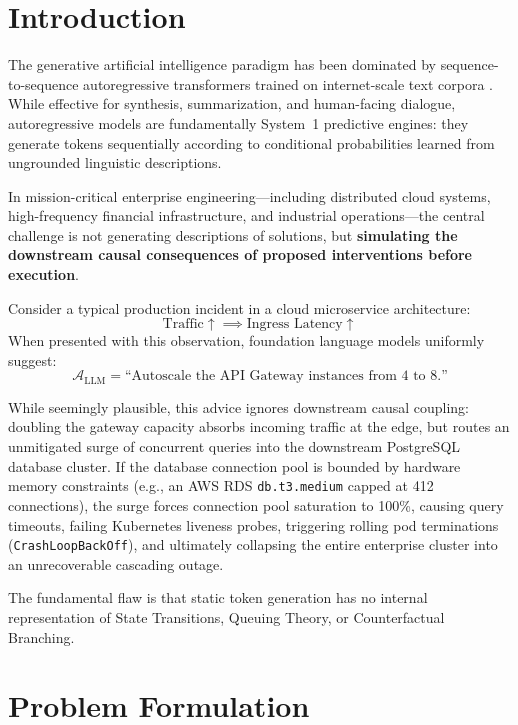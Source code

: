 \documentclass[10pt,twocolumn,letterpaper]{article}
\begin{document}
\section{Introduction}
The generative artificial intelligence paradigm has been dominated by sequence-to-sequence autoregressive transformers trained on internet-scale text corpora \cite{vaswani2017attention}. While effective for synthesis, summarization, and human-facing dialogue, autoregressive models are fundamentally System~1 predictive engines: they generate tokens sequentially according to conditional probabilities learned from ungrounded linguistic descriptions.

In mission-critical enterprise engineering---including distributed cloud systems, high-frequency financial infrastructure, and industrial operations---the central challenge is not generating descriptions of solutions, but \textbf{simulating the downstream causal consequences of proposed interventions before execution}.

Consider a typical production incident in a cloud microservice architecture:
\begin{equation}
\text{Traffic} \uparrow \implies \text{Ingress Latency} \uparrow
\end{equation}
When presented with this observation, foundation language models uniformly suggest:
\begin{equation}
\mathcal{A}_{\text{LLM}} = \text{``Autoscale the API Gateway instances from 4 to 8.''}
\end{equation}

While seemingly plausible, this advice ignores downstream causal coupling: doubling the gateway capacity absorbs incoming traffic at the edge, but routes an unmitigated surge of concurrent queries into the downstream PostgreSQL database cluster. If the database connection pool is bounded by hardware memory constraints (e.g., an AWS RDS \texttt{db.t3.medium} capped at 412 connections), the surge forces connection pool saturation to 100\%, causing query timeouts, failing Kubernetes liveness probes, triggering rolling pod terminations (\texttt{CrashLoopBackOff}), and ultimately collapsing the entire enterprise cluster into an unrecoverable cascading outage.

The fundamental flaw is that static token generation has no internal representation of State Transitions, Queuing Theory, or Counterfactual Branching.

\section{Problem Formulation}
\end{document}
